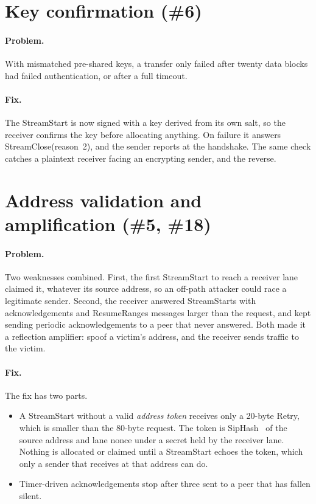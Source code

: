 \section{Key confirmation (\#6)}

\paragraph{Problem.} With mismatched pre-shared keys, a transfer only failed after twenty data blocks had failed
authentication, or after a full timeout.

\paragraph{Fix.} The StreamStart is now signed with a key derived from its own salt, so the receiver confirms
the key before allocating anything. On failure it answers StreamClose(reason~2), and the sender reports
 at the handshake. The same check catches a plaintext receiver facing an encrypting sender, and
the reverse.

\section{Address validation and amplification (\#5, \#18)}

\paragraph{Problem.} Two weaknesses combined. First, the first StreamStart to reach a receiver lane claimed it,
whatever its source address, so an off-path attacker could race a legitimate sender. Second, the receiver
answered StreamStarts with acknowledgements and ResumeRanges messages larger than the request, and kept sending
periodic acknowledgements to a peer that never answered. Both made it a reflection amplifier: spoof a victim's
address, and the receiver sends traffic to the victim.

\paragraph{Fix.} The fix has two parts.
\begin{itemize}
  \item A StreamStart without a valid \emph{address token} receives only a 20-byte Retry, which is smaller than
    the 80-byte request. The token is SipHash~\cite{siphash} of the source address and lane nonce under a
    secret held by the receiver lane. Nothing is allocated or claimed until a StreamStart echoes the token, which
    only a sender that receives at that address can do.
  \item Timer-driven acknowledgements stop after three sent to a peer that has fallen silent.
\end{itemize}

